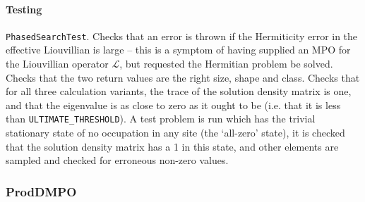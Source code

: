  \paragraph{Testing} \lstinline$PhasedSearchTest$. Checks that an error is thrown if the Hermiticity error in the effective Liouvillian is large -- this is a symptom of having supplied an MPO for the Liouvillian operator \(\mathcal{L}\), but requested the Hermitian problem be solved. Checks that the two return values are the right size, shape and class. Checks that for all three calculation variants, the trace of the solution density matrix is one, and that the eigenvalue is as close to zero as it ought to be (i.e. that it is less than \lstinline$ULTIMATE_THRESHOLD$). A test problem is run which has the trivial stationary state of no occupation in any site (the `all-zero' state), it is checked that the solution density matrix has a 1 in this state, and other elements are sampled and checked for erroneous non-zero values.
 
 \subsubsection{ProdDMPO}
